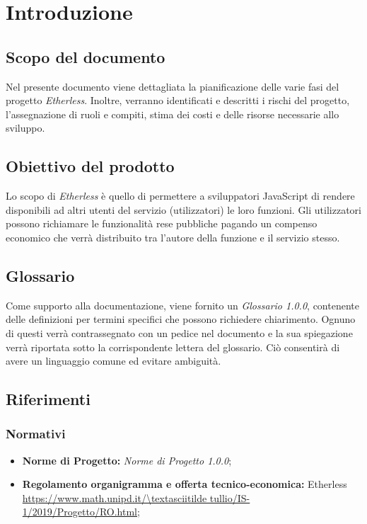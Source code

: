 \section{Introduzione}
\subsection{Scopo del documento}
Nel presente documento viene dettagliata la pianificazione delle varie fasi del progetto \textit{Etherless}. Inoltre, verranno identificati e descritti i rischi del progetto, l'assegnazione di ruoli e compiti, stima dei costi e delle risorse necessarie allo sviluppo.
\subsection{Obiettivo del prodotto}
Lo scopo di \textit{Etherless} è quello di permettere a sviluppatori JavaScript di rendere disponibili ad altri utenti del servizio (utilizzatori) le loro funzioni. Gli utilizzatori possono richiamare le funzionalità rese pubbliche pagando un compenso economico che verrà distribuito tra l'autore della funzione e il servizio stesso.
\subsection{Glossario}
Come supporto alla documentazione, viene fornito un \textit{Glossario 1.0.0}\docs, contenente delle definizioni per termini specifici che possono richiedere chiarimento. Ognuno di questi verrà contrassegnato con un pedice \glo nel documento e la sua spiegazione verrà riportata sotto la corrispondente lettera del glossario. Ciò consentirà di avere un linguaggio comune ed evitare ambiguità. 
\subsection{Riferimenti}
\subsubsection{Normativi}
	\begin{itemize}
		\item \textbf{Norme di Progetto:} \textit{Norme di Progetto 1.0.0}\docs;
		\item \textbf{Regolamento organigramma e offerta tecnico-economica:} Etherless\\ 
			\url{https://www.math.unipd.it/\textasciitilde tullio/IS-1/2019/Progetto/RO.html};
	\end{itemize}
